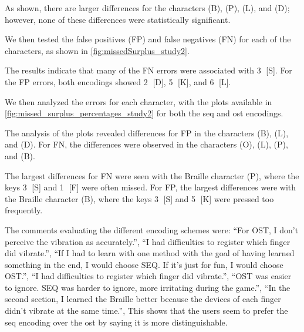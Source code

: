 As shown, there are larger differences for the characters (B), (P), (L), and (D); however, none of these differences were statistically significant.


We then tested the false positives (FP) and false negatives (FN) for each of the characters, as shown in \autoref{fig:missedSurplus_study2}.

The results indicate that many of the FN errors were associated with \textcircled{3} [S]. For the FP errors, both encodings showed \textcircled{2} [D], \textcircled{5} [K], and \textcircled{6} [L].


We then analyzed the errors for each character, with the plots available in \autoref{fig:missed_surplus_percentages_study2} for both the seq and ost encodings.

The analysis of the plots revealed differences for FP in the characters (B), (L), and (D). For FN, the differences were observed in the characters (O), (L), (P), and (B).

The largest differences for FN were seen with the Braille character (P), where the keys \textcircled{3} [S] and \textcircled{1} [F] were often missed. For FP, the largest differences were with the Braille character (B), where the keys \textcircled{3} [S] and \textcircled{5} [K] were pressed too frequently.


The comments evaluating the different encoding schemes were:
\enquote{For OST, I don't perceive the vibration as accurately.},
\enquote{I had difficulties to register which finger did vibrate.},
\enquote{If I had to learn with one method with the goal of having learned something in the end, I would choose SEQ. If it's just for fun, I would choose OST.},
\enquote{I had difficulties to register which finger did vibrate.},
\enquote{OST was easier to ignore. SEQ was harder to ignore, more irritating during the game.},
\enquote{In the second section, I learned the Braille better because the devices of each finger didn’t vibrate at the same time.},
This shows that the users seem to prefer the \gls{seq} encoding over the \gls{ost} by saying it is more distinguishable.






